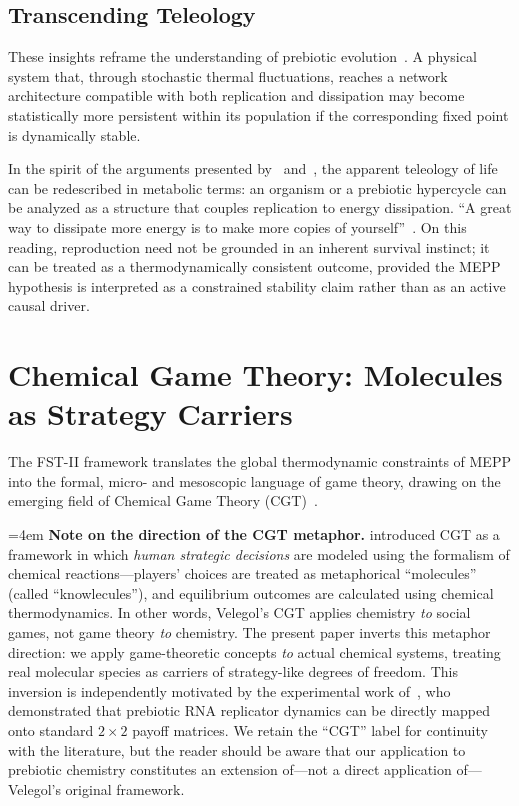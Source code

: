 \documentclass[12pt,a4paper]{article}
\theoremstyle{remark}
\begin{document}
\subsection{Transcending Teleology}

These insights reframe the understanding of prebiotic evolution~\citep{UnbecomingBeing}. A physical system that, through stochastic thermal fluctuations, reaches a network architecture compatible with both replication and dissipation may become statistically more persistent within its population if the corresponding fixed point is dynamically stable.

In the spirit of the arguments presented by~\citet{UnbecomingBeing} and~\citet{England2013}, the apparent teleology of life can be redescribed in metabolic terms: an organism or a prebiotic hypercycle can be analyzed as a structure that couples replication to energy dissipation. ``A great way to dissipate more energy is to make more copies of yourself''~\citep{England2013}. On this reading, reproduction need not be grounded in an inherent survival instinct; it can be treated as a thermodynamically consistent outcome, provided the MEPP hypothesis is interpreted as a constrained stability claim rather than as an active causal driver.

\section{Chemical Game Theory: Molecules as Strategy Carriers}
\label{sec:cgt}

The FST-II framework translates the global thermodynamic constraints of MEPP into the formal, micro- and mesoscopic language of game theory, drawing on the emerging field of Chemical Game Theory (CGT)~\citep{CGT2018,CGTMacmillan}.

{\emergencystretch=4em \textbf{Note on the direction of the CGT metaphor.} \citet{CGT2018} introduced CGT as a framework in which \emph{human strategic decisions} are modeled using the formalism of chemical reactions---players' choices are treated as metaphorical ``molecules'' (called ``knowlecules''), and equilibrium outcomes are calculated using chemical thermodynamics. In other words, Velegol's CGT applies chemistry \emph{to} social games, not game theory \emph{to} chemistry. The present paper inverts this metaphor direction: we apply game-theoretic concepts \emph{to} actual chemical systems, treating real molecular species as carriers of strategy-like degrees of freedom. This inversion is independently motivated by the experimental work of~\citet{AzoarcusPNAS}, who demonstrated that prebiotic RNA replicator dynamics can be directly mapped onto standard $2\times 2$ payoff matrices. We retain the ``CGT'' label for continuity with the literature, but the reader should be aware that our application to prebiotic chemistry constitutes an extension of---not a direct application of---Velegol's original framework.\par}
\end{document}
